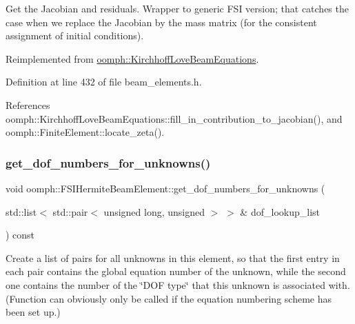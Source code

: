 Get the Jacobian and residuals. Wrapper to generic F\+SI version; that catches the case when we replace the Jacobian by the mass matrix (for the consistent assignment of initial conditions). 



Reimplemented from \hyperlink{classoomph_1_1KirchhoffLoveBeamEquations_af335ab12a9b5e870f25516a53b2a7b60}{oomph\+::\+Kirchhoff\+Love\+Beam\+Equations}.



Definition at line 432 of file beam\+\_\+elements.\+h.



References oomph\+::\+Kirchhoff\+Love\+Beam\+Equations\+::fill\+\_\+in\+\_\+contribution\+\_\+to\+\_\+jacobian(), and oomph\+::\+Finite\+Element\+::locate\+\_\+zeta().

\mbox{\label{classoomph_1_1FSIHermiteBeamElement_aa8015d263121249c737f862f63044a1b}} 
\subsubsection{\texorpdfstring{get\+\_\+dof\+\_\+numbers\+\_\+for\+\_\+unknowns()}{get\_dof\_numbers\_for\_unknowns()}}
{\footnotesize\ttfamily void oomph\+::\+F\+S\+I\+Hermite\+Beam\+Element\+::get\+\_\+dof\+\_\+numbers\+\_\+for\+\_\+unknowns (\begin{DoxyParamCaption}\item[{std\+::list$<$ std\+::pair$<$ unsigned long, unsigned $>$ $>$ \&}]{dof\+\_\+lookup\+\_\+list }\end{DoxyParamCaption}) const\hspace{0.3cm}{\ttfamily [virtual]}}



Create a list of pairs for all unknowns in this element, so that the first entry in each pair contains the global equation number of the unknown, while the second one contains the number of the \char`\"{}\+D\+O\+F type\char`\"{} that this unknown is associated with. (Function can obviously only be called if the equation numbering scheme has been set up.) 

